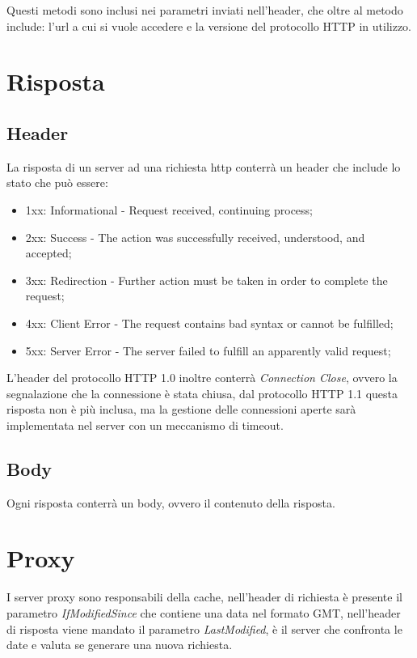 Questi metodi sono inclusi nei parametri inviati nell'header, che oltre al
metodo include: l'url a cui si vuole accedere e la versione del protocollo
HTTP in utilizzo.

\section{Risposta}
\subsection{Header}
La risposta di un server ad una richiesta http conterrà un header che include
lo stato che può essere:
\begin{itemize}
     \item 1xx: Informational - Request received, continuing process;
     \item 2xx: Success - The action was successfully received, understood, and
       accepted;
     \item 3xx: Redirection - Further action must be taken in order to complete
       the request;
     \item 4xx: Client Error - The request contains bad syntax or cannot be
       fulfilled;
     \item 5xx: Server Error - The server failed to fulfill an apparently valid
       request;
\end{itemize}

L'header del protocollo HTTP 1.0 inoltre conterrà \emph{Connection Close},
ovvero la segnalazione che la connessione è stata chiusa, dal protocollo
HTTP 1.1 questa risposta non è più inclusa, ma la gestione delle connessioni
aperte sarà implementata nel server con un meccanismo di timeout.

\subsection{Body}
Ogni risposta conterrà un body, ovvero il contenuto della risposta.

\section{Proxy}
I server proxy sono responsabili della cache, nell'header di richiesta è
presente il parametro \emph{IfModifiedSince} che contiene una data nel formato
GMT, nell'header di risposta viene mandato il parametro \emph{LastModified},
è il server che confronta le date e valuta se generare una nuova richiesta.
